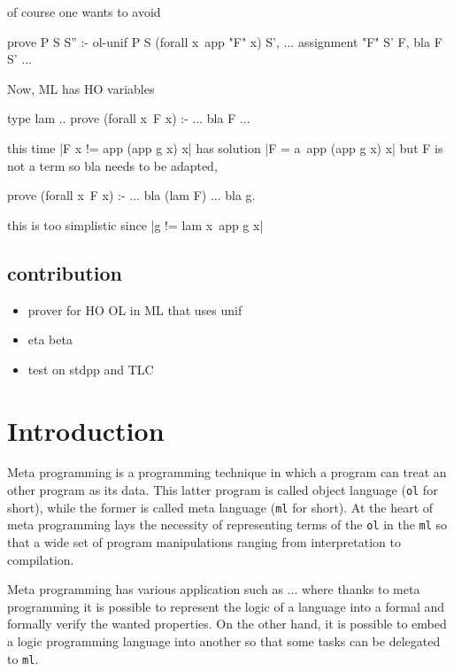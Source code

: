 \documentclass[sigconf,natbib=false]{acmart}
\newcommand*{\acronym}[1]{\texttt{#1}\xspace}
\def\ol{\acronym{ol}} %
\def\ml{\acronym{ml}} %
\begin{document}
of course one wants to avoid
\begin{elpicode}
prove P S S'' :- ol-unif P S (forall x\ app "F" x) S', ... assignment "F" S' F, bla F S' ...
\end{elpicode}

Now, ML has HO variables
\begin{elpicode}
type lam ..
prove (forall x\ F x) :- ... bla F ...
\end{elpicode}
this time  |F x != app (app g x) x| has solution
|F = a\ app (app g x) x| but F is not a term so
bla needs to be adapted,
\begin{elpicode}
prove (forall x\ F x) :- ... bla (lam F) ...
bla g.
\end{elpicode}
this is too simplistic since |g != lam x\ app g x|

\subsection{contribution}
\begin{itemize}
\item prover for HO OL in ML that uses unif
\item eta beta
\item test on stdpp and TLC
\end{itemize}


\section{Introduction}

Meta programming \cite{hill1994} is a programming technique in which a program
can treat an other program as its data. This latter program is called object
language (\ol for short), while the former is called meta language (\ml for
short). At the heart of meta programming lays the necessity of representing
terms of the \ol in the \ml so that a wide set of program
manipulations ranging from interpretation to compilation. 

Meta programming has various application such as ... where thanks to meta
programming it is possible to represent the logic of a language into a formal
and formally verify the wanted properties. On the other hand, it is possible to
embed a logic programming language into another so that some tasks can be
delegated to \ml.
\end{document}
